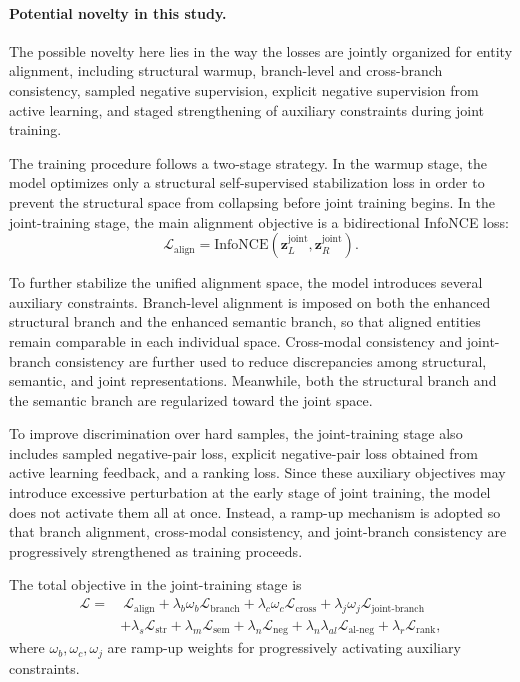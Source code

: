 \paragraph{Potential novelty in this study.}
The possible novelty here lies in the way the losses are jointly organized for entity alignment, including structural warmup, branch-level and cross-branch consistency, sampled negative supervision, explicit negative supervision from active learning, and staged strengthening of auxiliary constraints during joint training.

The training procedure follows a two-stage strategy. In the warmup stage, the model optimizes only a structural self-supervised stabilization loss in order to prevent the structural space from collapsing before joint training begins. In the joint-training stage, the main alignment objective is a bidirectional InfoNCE loss:
\begin{equation}
\mathcal{L}_{\mathrm{align}}
=
\mathrm{InfoNCE}
\left(
\mathbf{z}_{L}^{\mathrm{joint}},
\mathbf{z}_{R}^{\mathrm{joint}}
\right).
\end{equation}

To further stabilize the unified alignment space, the model introduces several auxiliary constraints. Branch-level alignment is imposed on both the enhanced structural branch and the enhanced semantic branch, so that aligned entities remain comparable in each individual space. Cross-modal consistency and joint-branch consistency are further used to reduce discrepancies among structural, semantic, and joint representations. Meanwhile, both the structural branch and the semantic branch are regularized toward the joint space.

To improve discrimination over hard samples, the joint-training stage also includes sampled negative-pair loss, explicit negative-pair loss obtained from active learning feedback, and a ranking loss. Since these auxiliary objectives may introduce excessive perturbation at the early stage of joint training, the model does not activate them all at once. Instead, a ramp-up mechanism is adopted so that branch alignment, cross-modal consistency, and joint-branch consistency are progressively strengthened as training proceeds.

The total objective in the joint-training stage is
\begin{equation}
\begin{aligned}
\mathcal{L}
=
&\ \mathcal{L}_{\mathrm{align}}
+
\lambda_b \omega_b \mathcal{L}_{\mathrm{branch}}
+
\lambda_c \omega_c \mathcal{L}_{\mathrm{cross}}
+
\lambda_j \omega_j \mathcal{L}_{\mathrm{joint\mbox{-}branch}} \\
&+
\lambda_s \mathcal{L}_{\mathrm{str}}
+
\lambda_m \mathcal{L}_{\mathrm{sem}}
+
\lambda_n \mathcal{L}_{\mathrm{neg}}
+
\lambda_n \lambda_{al}\mathcal{L}_{\mathrm{al\mbox{-}neg}}
+
\lambda_r \mathcal{L}_{\mathrm{rank}},
\end{aligned}
\end{equation}
where $\omega_b,\omega_c,\omega_j$ are ramp-up weights for progressively activating auxiliary constraints.

